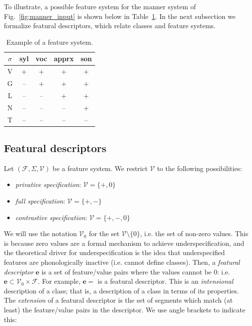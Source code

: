 \documentclass[11pt, oneside]{article}   	%
\begin{document}
\noindent To illustrate, a possible feature system for the manner system of Fig.~\ref{fig:manner_input} is shown below in Table~\ref{table:featurization}. In the next subsection we formalize featural descriptors, which relate classes and feature systems.

\begin{table}[h]
    \centering
    \begin{tabular} {|c||c|c|c|c|}
    \hline
        $\sigma$ & syl & voc & apprx & son \\ \hline
        V & + & + & + & + \\
        G & -- & + & + & + \\
        L & -- & -- & + & + \\
        N & -- & -- & -- & + \\
        T & -- & -- & -- & -- \\
        \hline
    \end{tabular}
    \caption{Example of a feature system.}
    \label{table:featurization}
\end{table}

\subsection{Featural descriptors}

Let $(\mathcal F, \Sigma, \mathcal V)$ be a feature system. We restrict $\mathcal V$ to the following possibilities: \begin{itemize}
    \item \textit{privative specification}: $\mathcal V = \{ +, 0 \}$
    \item \textit{full specification}: $\mathcal V = \{ +, - \}$
    \item \textit{contrastive specification}: $\mathcal V = \{ +, -, 0 \}$
    \end{itemize}

\noindent We will use the notation $\mathcal V_0$ for the set $\mathcal V \setminus \{0\}$, i.e. the set of non-zero values. This is because zero values are a formal mechanism to achieve underspecification, and the theoretical driver for underspecification is the idea that underspecified features are phonologically inactive (i.e. cannot define classes). Then, a \textit{featural descriptor} $\mathbf{e}$ is a set of feature/value pairs where the values cannot be $0$: i.e. $\mathbf{e} \subset \mathcal V_0 \times \mathcal F$. For example, $\mathbf{e} =$   is a featural descriptor. This is an \textit{intensional} description of a class; that is, a description of a class in terms of its properties. The \textit{extension} of a featural descriptor is the set of segments which match (at least) the feature/value pairs in the descriptor. We use angle brackets to indicate this:
\end{document}
